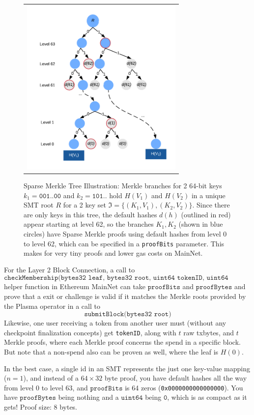 \documentclass{article}
\newcommand{\hash}[1]{H(#1)}
\newcommand{\proofBits}{\texttt{proofBits}}
\newcommand{\proofBytes}{\texttt{proofBytes}}
\begin{document}
\begin{figure}[t]
\begin{tabular}{c}
\centerline{\includegraphics[width=8cm]{SMT.png}} \\
\end{tabular}
\caption{\small Sparse Merkle Tree Illustration: Merkle branches for 2 64-bit keys $k_1=\texttt{001..00}$ and $k_2=\texttt{101..}$ hold $\hash{V_1}$ and $\hash{V_2}$ in a unique SMT root $R$ for a 2 key set $\mathfrak{I} = \{ (K_1, V_1), (K_2, V_2) \}$. Since there are only keys in this tree, the default hashes $d(h)$ (outlined in red) appear starting at level 62, so the branches $K_1, K_2$ (shown in blue circles) have Sparse Merkle proofs using default hashes from level 0 to level 62, which can be specified in a \texttt{proofBits} parameter.  This makes for very tiny proofs and lower gas costs on MainNet. }
\centering
\label{smt}
\end{figure}

For the Layer 2 Block Connection, a call to 
\[
\texttt{checkMembership(bytes32 leaf, bytes32 root, uint64 tokenID, uint64 proofBits, bytes proofBytes)}
\]
helper function in Ethereum MainNet can take $\proofBits$ and $\proofBytes$ and prove that a exit or challenge is valid if it matches the Merkle roots provided by the Plasma operator in a call to 
\[
\texttt{submitBlock(bytes32 root)}
\]
Likewise, one user receiving a token from another user must (without any checkpoint finalization concepts) get \texttt{tokenID}, along with $t$ raw txbytes, and $t$ Merkle proofs, where each Merkle proof concerns the spend in a specific block. But note that a non-spend also can be proven as well, where the leaf is $H(0)$. 

In the best case, a single id in an SMT represents the just one key-value mapping ($n=1$), and instead of a $64 \times 32$ byte proof, you have default hashes all the way from level 0 to level 63, and $\proofBits$ is 64 zeros (\texttt{0x0000000000000000}). You have $\proofBytes$ being nothing and a $\texttt{uint64}$ being $\texttt{0}$, which is as compact as it gets! Proof size: 8 bytes.
\end{document}
